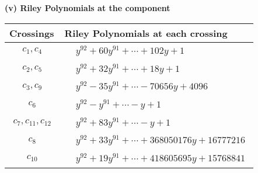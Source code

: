 \documentclass[1p]{elsarticle_modified}
\theoremstyle{definition}
\begin{document}
\flushleft \textbf{(v) Riley Polynomials at the component}\newline \\
\begin{tabular}{m{50pt}|m{274pt}}
Crossings & \hspace{64pt}Riley Polynomials at each crossing \\
\hline $$\begin{aligned}c_{1},c_{4}\end{aligned}$$&$\begin{aligned}
&y^{92}+60 y^{91}+\cdots+102 y+1
\end{aligned}$\\
\hline $$\begin{aligned}c_{2},c_{5}\end{aligned}$$&$\begin{aligned}
&y^{92}+32 y^{91}+\cdots+18 y+1
\end{aligned}$\\
\hline $$\begin{aligned}c_{3},c_{9}\end{aligned}$$&$\begin{aligned}
&y^{92}-35 y^{91}+\cdots-70656 y+4096
\end{aligned}$\\
\hline $$\begin{aligned}c_{6}\end{aligned}$$&$\begin{aligned}
&y^{92}- y^{91}+\cdots- y+1
\end{aligned}$\\
\hline $$\begin{aligned}c_{7},c_{11},c_{12}\end{aligned}$$&$\begin{aligned}
&y^{92}+83 y^{91}+\cdots- y+1
\end{aligned}$\\
\hline $$\begin{aligned}c_{8}\end{aligned}$$&$\begin{aligned}
&y^{92}+33 y^{91}+\cdots+368050176 y+16777216
\end{aligned}$\\
\hline $$\begin{aligned}c_{10}\end{aligned}$$&$\begin{aligned}
&y^{92}+19 y^{91}+\cdots+418605695 y+15768841
\end{aligned}$\\
\hline
\end{tabular}\\~\\
\end{document}
